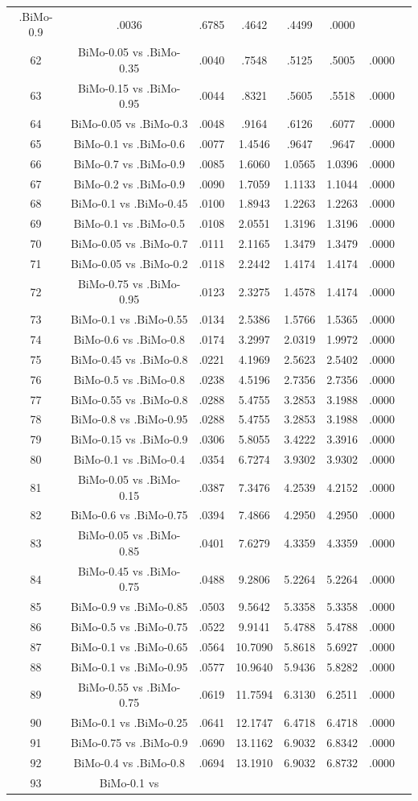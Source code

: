 \documentclass[a4paper,10pt]{article}
\begin{document}
\begin{landscape}
\begin{table}[!htp]
\begin{tabular}{cccccccc}
.BiMo-0.9&.0036&.6785&.4642&.4499&.0000\\62&BiMo-0.05 vs .BiMo-0.35&.0040&.7548&.5125&.5005&.0000\\63&BiMo-0.15 vs .BiMo-0.95&.0044&.8321&.5605&.5518&.0000\\64&BiMo-0.05 vs .BiMo-0.3&.0048&.9164&.6126&.6077&.0000\\65&BiMo-0.1 vs .BiMo-0.6&.0077&1.4546&.9647&.9647&.0000\\66&BiMo-0.7 vs .BiMo-0.9&.0085&1.6060&1.0565&1.0396&.0000\\67&BiMo-0.2 vs .BiMo-0.9&.0090&1.7059&1.1133&1.1044&.0000\\68&BiMo-0.1 vs .BiMo-0.45&.0100&1.8943&1.2263&1.2263&.0000\\69&BiMo-0.1 vs .BiMo-0.5&.0108&2.0551&1.3196&1.3196&.0000\\70&BiMo-0.05 vs .BiMo-0.7&.0111&2.1165&1.3479&1.3479&.0000\\71&BiMo-0.05 vs .BiMo-0.2&.0118&2.2442&1.4174&1.4174&.0000\\72&BiMo-0.75 vs .BiMo-0.95&.0123&2.3275&1.4578&1.4174&.0000\\73&BiMo-0.1 vs .BiMo-0.55&.0134&2.5386&1.5766&1.5365&.0000\\74&BiMo-0.6 vs .BiMo-0.8&.0174&3.2997&2.0319&1.9972&.0000\\75&BiMo-0.45 vs .BiMo-0.8&.0221&4.1969&2.5623&2.5402&.0000\\76&BiMo-0.5 vs .BiMo-0.8&.0238&4.5196&2.7356&2.7356&.0000\\77&BiMo-0.55 vs .BiMo-0.8&.0288&5.4755&3.2853&3.1988&.0000\\78&BiMo-0.8 vs .BiMo-0.95&.0288&5.4755&3.2853&3.1988&.0000\\79&BiMo-0.15 vs .BiMo-0.9&.0306&5.8055&3.4222&3.3916&.0000\\80&BiMo-0.1 vs .BiMo-0.4&.0354&6.7274&3.9302&3.9302&.0000\\81&BiMo-0.05 vs .BiMo-0.15&.0387&7.3476&4.2539&4.2152&.0000\\82&BiMo-0.6 vs .BiMo-0.75&.0394&7.4866&4.2950&4.2950&.0000\\83&BiMo-0.05 vs .BiMo-0.85&.0401&7.6279&4.3359&4.3359&.0000\\84&BiMo-0.45 vs .BiMo-0.75&.0488&9.2806&5.2264&5.2264&.0000\\85&BiMo-0.9 vs .BiMo-0.85&.0503&9.5642&5.3358&5.3358&.0000\\86&BiMo-0.5 vs .BiMo-0.75&.0522&9.9141&5.4788&5.4788&.0000\\87&BiMo-0.1 vs .BiMo-0.65&.0564&10.7090&5.8618&5.6927&.0000\\88&BiMo-0.1 vs .BiMo-0.95&.0577&10.9640&5.9436&5.8282&.0000\\89&BiMo-0.55 vs .BiMo-0.75&.0619&11.7594&6.3130&6.2511&.0000\\90&BiMo-0.1 vs .BiMo-0.25&.0641&12.1747&6.4718&6.4718&.0000\\91&BiMo-0.75 vs .BiMo-0.9&.0690&13.1162&6.9032&6.8342&.0000\\92&BiMo-0.4 vs .BiMo-0.8&.0694&13.1910&6.9032&6.8732&.0000\\93&BiMo-0.1 vs 
\end{tabular}
\end{table}
\end{landscape}
\end{document}
